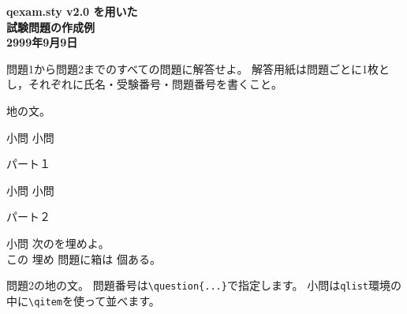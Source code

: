 \documentclass[dvipdfmx,11pt,a4j]{jarticle}
\begin{document}


\begin{center}
	\textbf{\Large  qexam.sty v2.0 を用いた\\
	\bigskip
	試験問題の作成例}\\
	\bigskip
	\textbf{\large 2999年9月9日}
\end{center}

問題1から問題2までのすべての問題に解答せよ。
解答用紙は問題ごとに1枚とし，それぞれに氏名・受験番号・問題番号を書くこと。

地の文。
\begin{qlist}
	\qitem 小問
	\qitem 小問
\end{qlist}

\begin{qparts}
	\qpart パート１
		\begin{qlist}
			\qitem 小問
			\qitem 小問
		\end{qlist}
	\qpart パート２
		\begin{qlist}
			\qitem 小問
			\qitem 次の\qbox{(a) -- (b)}を埋めよ。\\
				この \qbox{}埋め 問題に箱は \qbox{}個ある。
		\end{qlist}
\end{qparts}



\clearpage
{}
問題2の地の文。
問題番号は{\tt \verb"\question{...}"}で指定します。
小問は{\tt qlist}環境の中に{\tt \verb"\qitem"}を使って並べます。
\end{document}
